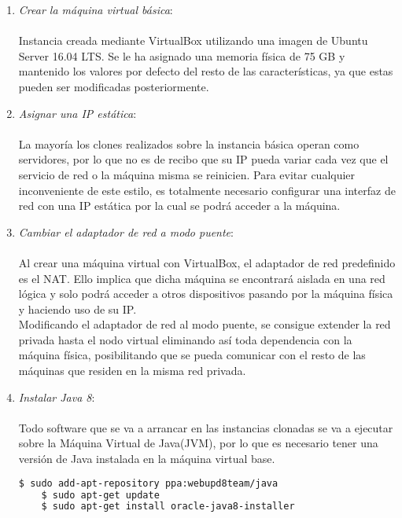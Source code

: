 \begin{enumerate}
	
	\item \textit{Crear la máquina virtual básica}:\\\\Instancia creada mediante VirtualBox utilizando una imagen de Ubuntu Server 16.04 LTS. Se le ha asignado una memoria física de 75 GB y mantenido los valores por defecto del resto de las características, ya que estas pueden ser modificadas posteriormente.
	
	\item \textit{Asignar una IP estática}:\\\\La mayoría los clones realizados sobre la instancia básica operan como servidores, por lo que no es de recibo que su IP pueda variar cada vez que el servicio de red o la máquina misma se reinicien. Para evitar cualquier inconveniente de este estilo, es totalmente necesario configurar una interfaz de red con una IP estática por la cual se podrá acceder a la máquina.
	
	\item \textit{Cambiar el adaptador de red a modo puente}:\\\\Al crear una máquina virtual con VirtualBox, el adaptador de red predefinido es el NAT. Ello implica que dicha máquina se encontrará aislada en una red lógica y solo podrá acceder a otros dispositivos pasando por la máquina física y haciendo uso de su IP.\\
	Modificando el adaptador de red al modo puente, se consigue extender la red privada hasta el nodo virtual eliminando así toda dependencia con la máquina física, posibilitando que se pueda comunicar con el resto de las máquinas que residen en la misma red privada.
	
	\item \textit{Instalar Java 8}:\\\\Todo software que se va a arrancar en las instancias clonadas se va a ejecutar sobre la Máquina Virtual de Java(JVM), por lo que es necesario tener una versión de Java instalada en la máquina virtual base.
	
	\begin{lstlisting}[language=bash]
	$ sudo add-apt-repository ppa:webupd8team/java
	$ sudo apt-get update
	$ sudo apt-get install oracle-java8-installer
	\end{lstlisting}

\end{enumerate}

